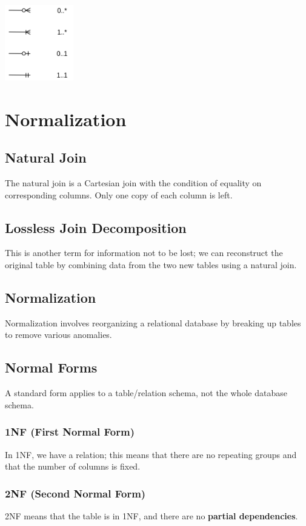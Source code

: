 \documentclass{article}
\begin{document}
\centerline{\includegraphics[width=3cm]{./assets/crows.png}}

\section{Normalization}
\subsection{Natural Join}
The natural join is a Cartesian join with the condition of equality on corresponding columns. Only one copy of each column is left.

\subsection{Lossless Join Decomposition}
This is another term for information not to be lost; we can reconstruct the original table by combining data from the two new tables using a natural join.

\subsection{Normalization}
Normalization involves reorganizing a relational database by breaking up tables to remove various anomalies.

\subsection{Normal Forms}
A standard form applies to a table/relation schema, not the whole database schema.

\subsubsection{1NF (First Normal Form)}
In 1NF, we have a relation; this means that there are no repeating groups and that the number of columns is fixed.

\subsubsection{2NF (Second Normal Form)}
2NF means that the table is in 1NF, and there are no \textbf{partial dependencies}.
\end{document}
